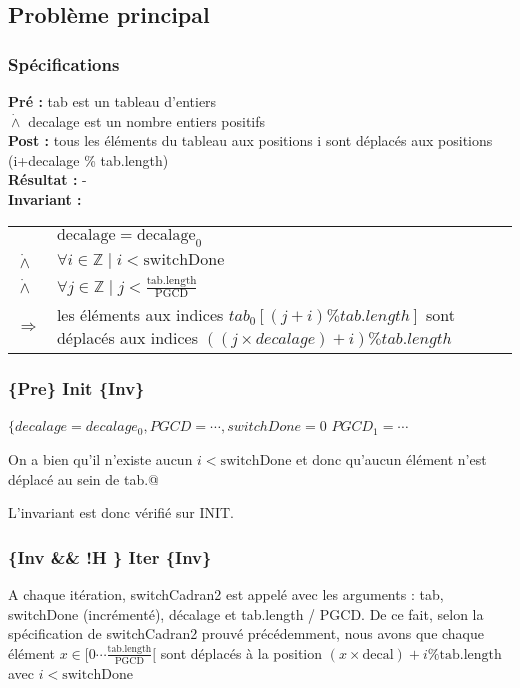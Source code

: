 \subsection{Problème principal}
\subsubsection*{Spécifications}

\noindent \textbf{Pré :} tab est un tableau d'entiers\\
\indent $\dot{\wedge}$ decalage est un nombre entiers positifs\\
\textbf{Post :} tous les éléments du tableau aux positions i sont déplacés aux positions (i+decalage \% tab.length)\\
\textbf{Résultat :} - \\



\textbf{Invariant :}

\begin{tabular}{lp{14cm}}

& $\mathrm{decalage}=\mathrm{decalage}_{0}$ \\
$\dot{\wedge}$ & $\forall i \in \mathbb{Z} \mid i < \mathrm{switchDone} $ \\
$\dot{\wedge}$ & $\forall j \in \mathbb{Z} \mid j < \frac{\mathrm{tab.length}}{\mathrm{PGCD}}$ \\
$\Rightarrow$ & les éléments aux indices $tab_{0}[(j+i) \% tab.length]$ sont déplacés aux indices $((j\times decalage)+i) \% tab.length$ \\
\end{tabular}

\subsubsection*{\{Pre\} Init \{Inv\}}

$\{decalage=decalage_{0}, PGCD =\cdots, switchDone=0$
$PGCD_{1} = \cdots$

On a bien qu'il n'existe aucun $i < \mathrm{switchDone}$ et donc
qu'aucun élément n'est déplacé au sein de tab.@

L'invariant est donc vérifié sur INIT.

\subsubsection*{\{Inv \&\& !H \} Iter \{Inv\}}

A chaque itération, switchCadran2 est appelé avec les arguments : tab,
switchDone (incrémenté), décalage et tab.length / PGCD. De ce fait,
selon la spécification de switchCadran2 prouvé précédemment, nous avons
que chaque élément $x \in [0\cdots
    \frac{\mathrm{tab.length}}{\mathrm{PGCD}}[$ sont déplacés à la
        position $(x\times \mathrm{decal})+i \% \mathrm{tab.length}$ avec $i < \mathrm{switchDone}$

